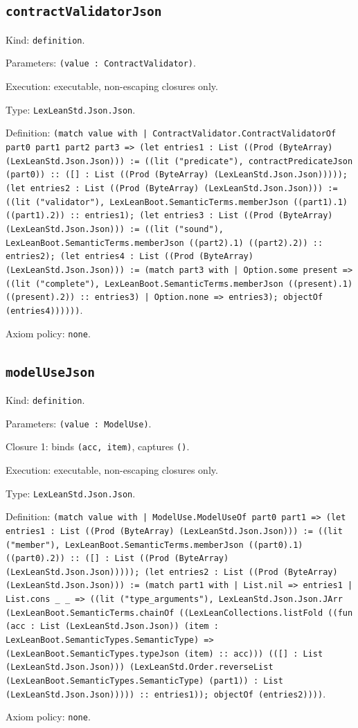 \documentclass[11pt]{article}
\begin{document}
\subsection*{\texttt{contractValidatorJson}}
\noindent Kind: \texttt{definition}.\par
\noindent Parameters: \texttt{(value : ContractValidator)}.\par
\noindent Execution: executable, non-escaping closures only.\par
\noindent Type: \texttt{LexLeanStd.Json.Json}.\par
\noindent Definition: \texttt{(match value with | ContractValidator.ContractValidatorOf part0 part1 part2 part3 => (let entries1 : List ((Prod (ByteArray) (LexLeanStd.Json.Json))) := ((lit ("predicate"), contractPredicateJson (part0)) :: ([] : List ((Prod (ByteArray) (LexLeanStd.Json.Json))))); (let entries2 : List ((Prod (ByteArray) (LexLeanStd.Json.Json))) := ((lit ("validator"), LexLeanBoot.SemanticTerms.memberJson ((part1).1) ((part1).2)) :: entries1); (let entries3 : List ((Prod (ByteArray) (LexLeanStd.Json.Json))) := ((lit ("sound"), LexLeanBoot.SemanticTerms.memberJson ((part2).1) ((part2).2)) :: entries2); (let entries4 : List ((Prod (ByteArray) (LexLeanStd.Json.Json))) := (match part3 with | Option.some present => ((lit ("complete"), LexLeanBoot.SemanticTerms.memberJson ((present).1) ((present).2)) :: entries3) | Option.none => entries3); objectOf (entries4))))))}.\par
\noindent Axiom policy: \texttt{none}.\par
\subsection*{\texttt{modelUseJson}}
\noindent Kind: \texttt{definition}.\par
\noindent Parameters: \texttt{(value : ModelUse)}.\par
\noindent Closure 1: binds \texttt{(acc, item)}, captures \texttt{()}.\par
\noindent Execution: executable, non-escaping closures only.\par
\noindent Type: \texttt{LexLeanStd.Json.Json}.\par
\noindent Definition: \texttt{(match value with | ModelUse.ModelUseOf part0 part1 => (let entries1 : List ((Prod (ByteArray) (LexLeanStd.Json.Json))) := ((lit ("member"), LexLeanBoot.SemanticTerms.memberJson ((part0).1) ((part0).2)) :: ([] : List ((Prod (ByteArray) (LexLeanStd.Json.Json))))); (let entries2 : List ((Prod (ByteArray) (LexLeanStd.Json.Json))) := (match part1 with | List.nil => entries1 | List.cons \_ \_ => ((lit ("type\_arguments"), LexLeanStd.Json.Json.JArr (LexLeanBoot.SemanticTerms.chainOf ((LexLeanCollections.listFold ((fun (acc : List (LexLeanStd.Json.Json)) (item : LexLeanBoot.SemanticTypes.SemanticType) => (LexLeanBoot.SemanticTypes.typeJson (item) :: acc))) (([] : List (LexLeanStd.Json.Json))) (LexLeanStd.Order.reverseList (LexLeanBoot.SemanticTypes.SemanticType) (part1)) : List (LexLeanStd.Json.Json))))) :: entries1)); objectOf (entries2))))}.\par
\noindent Axiom policy: \texttt{none}.\par
\end{document}
